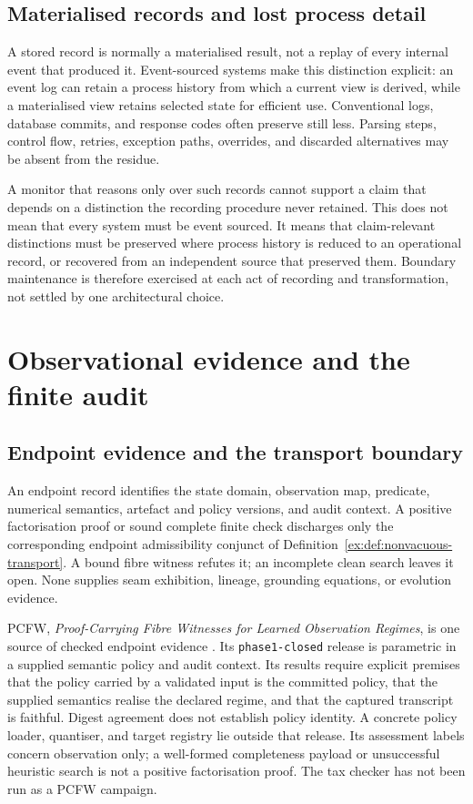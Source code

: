 \documentclass[twocolumn,envcountsect,envcountsame,natbib]{svjour3}
\newcommand{\code}[1]{\texttt{#1}}
\begin{document}
\subsection{Materialised records and lost process detail}\label{ex:sec:settlement}

A stored record is normally a materialised result, not a replay of every internal event that produced it. Event-sourced systems make this distinction explicit: an event log can retain a process history from which a current view is derived, while a materialised view retains selected state for efficient use. Conventional logs, database commits, and response codes often preserve still less. Parsing steps, control flow, retries, exception paths, overrides, and discarded alternatives may be absent from the residue.

A monitor that reasons only over such records cannot support a claim that depends on a distinction the recording procedure never retained. This does not mean that every system must be event sourced. It means that claim-relevant distinctions must be preserved where process history is reduced to an operational record, or recovered from an independent source that preserved them. Boundary maintenance is therefore exercised at each act of recording and transformation, not settled by one architectural choice.

\section{Observational evidence and the finite audit}\label{ex:sec:observational}
\subsection{Endpoint evidence and the transport boundary}\label{ex:sec:pcfw}

An endpoint record identifies the state domain, observation map, predicate, numerical semantics, artefact and policy versions, and audit context. A positive factorisation proof or sound complete finite check discharges only the corresponding endpoint admissibility conjunct of Definition~\ref{ex:def:nonvacuous-transport}. A bound fibre witness refutes it; an incomplete clean search leaves it open. None supplies seam exhibition, lineage, grounding equations, or evolution evidence.

PCFW, \emph{Proof-Carrying Fibre Witnesses for Learned Observation Regimes}, is one source of checked endpoint evidence \citep{moore2026pcfw}. Its \code{phase1-closed} release is parametric in a supplied semantic policy and audit context. Its results require explicit premises that the policy carried by a validated input is the committed policy, that the supplied semantics realise the declared regime, and that the captured transcript is faithful. Digest agreement does not establish policy identity. A concrete policy loader, quantiser, and target registry lie outside that release. Its assessment labels concern observation only; a well-formed completeness payload or unsuccessful heuristic search is not a positive factorisation proof. The tax checker has not been run as a PCFW campaign.
\end{document}
